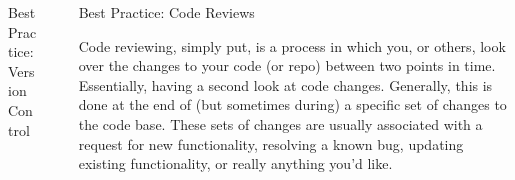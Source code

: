 \documentclass[final]{beamer}
\newlength{\sepwidth}
\newlength{\colwidth}
\newcommand{\separatorcolumn}{\begin{column}{\sepwidth}\end{column}}
\begin{document}
\begin{frame}[t]
\begin{columns}[t]
\begin{column}{\colwidth}
\begin{block}{Best Practice: Version Control}

  \end{block}

\end{column}

\separatorcolumn

\begin{column}{\colwidth}

  \begin{block}{Best Practice: Code Reviews}

    Code reviewing, simply put, is a process in which you, or others, look over
    the changes to your code (or repo) between two points in time.
    Essentially, having a second look at code changes.
    Generally, this is done at the end of (but sometimes during) a specific set
    of changes to the code base.
    These sets of changes are usually associated with a request for new
    functionality, resolving a known bug, updating existing functionality, or
    really anything you'd like.
  

\end{block}
\end{column}
\end{columns}
\end{frame}
\end{document}
